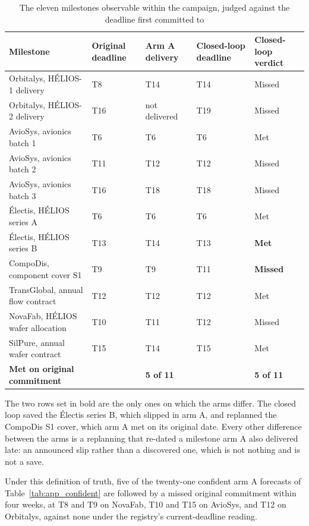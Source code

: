 \begin{table}[htbp]
\centering
\caption{The eleven milestones observable within the campaign, judged against the deadline
first committed to}
\label{tab:app_milestones_original}
\small
\begin{tabularx}{\linewidth}{>{\raggedright\arraybackslash}p{4.6cm} >{\centering\arraybackslash}X >{\centering\arraybackslash}X >{\centering\arraybackslash}X >{\centering\arraybackslash}X}
\toprule
\textbf{Milestone} & \textbf{Original deadline} & \textbf{Arm A delivery} &
\textbf{Closed-loop deadline} & \textbf{Closed-loop verdict} \\
\midrule
Orbitalys, H\'ELIOS-1 delivery & T8 & T14 & T14 & Missed \\
Orbitalys, H\'ELIOS-2 delivery & T16 & not delivered & T19 & Missed \\
AvioSys, avionics batch 1 & T6 & T6 & T6 & Met \\
AvioSys, avionics batch 2 & T11 & T12 & T12 & Missed \\
AvioSys, avionics batch 3 & T16 & T18 & T18 & Missed \\
\'Electis, H\'ELIOS series A & T6 & T6 & T6 & Met \\
\'Electis, H\'ELIOS series B & T13 & T14 & T13 & \textbf{Met} \\
CompoDis, component cover S1 & T9 & T9 & T11 & \textbf{Missed} \\
TransGlobal, annual flow contract & T12 & T12 & T12 & Met \\
NovaFab, H\'ELIOS wafer allocation & T10 & T11 & T12 & Missed \\
SilPure, annual wafer contract & T15 & T14 & T15 & Met \\
\midrule
\textbf{Met on original commitment} & & \textbf{5 of 11} & & \textbf{5 of 11} \\
\bottomrule
\end{tabularx}
\end{table}

The two rows set in bold are the only ones on which the arms differ. The closed loop saved
the \'Electis series B, which slipped in arm A, and replanned the CompoDis S1 cover, which
arm A met on its original date. Every other difference between the arms is a replanning that
re-dated a milestone arm A also delivered late: an announced slip rather than a discovered
one, which is not nothing and is not a save.

Under this definition of truth, five of the twenty-one confident arm A forecasts of
Table~\ref{tab:app_confident} are followed by a missed original commitment within four weeks,
at T8 and T9 on NovaFab, T10 and T15 on AvioSys, and T12 on Orbitalys, against none under the
registry's current-deadline reading.

